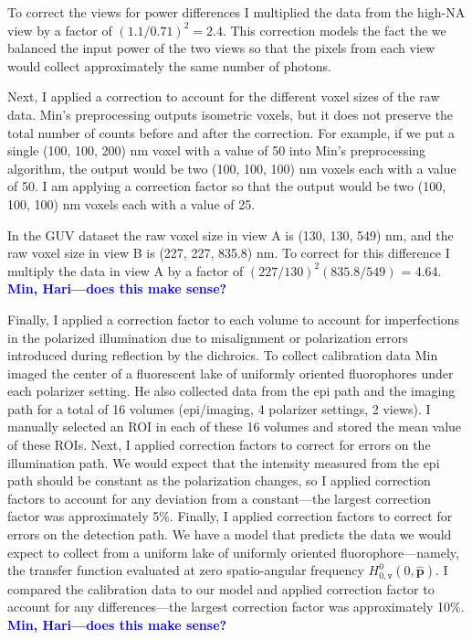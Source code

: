 \documentclass[11pt]{article}
\providecommand{\mh}[1]{\mathbf{\hat{#1}}}
\providecommand{\tv}{\texttt{v}}
\begin{document}
To correct the views for power differences I multiplied the data from the
high-NA view by a factor of $(1.1/0.71)^2 = 2.4$. This correction models the fact the we
balanced the input power of the two views so that the pixels from each view
would collect approximately the same number of photons.

Next, I applied a correction to account for the different voxel sizes of the raw
data. Min's preprocessing outputs isometric voxels, but it does not preserve the
total number of counts before and after the correction. For example, if we put a
single (100, 100, 200) nm voxel with a value of 50 into Min's preprocessing
algorithm, the output would be two (100, 100, 100) nm voxels each with a value
of 50. I am applying a correction factor so that the output would be two (100,
100, 100) nm voxels each with a value of 25.

In the GUV dataset the raw voxel size in view A is (130, 130, 549)
nm, and the raw voxel size in view B is (227, 227, 835.8) nm. To correct for
this difference I multiply the data in view A by a factor of
$(227/130)^2(835.8/549)$ = 4.64. \textcolor{blue}{\textbf{Min, Hari---does this make sense?}}

Finally, I applied a correction factor to each volume to account for
imperfections in the polarized illumination due to misalignment or polarization
errors introduced during reflection by the dichroics. To collect calibration
data Min imaged the center of a fluorescent lake of uniformly oriented
fluorophores under each polarizer setting. He also collected data from the epi
path and the imaging path for a total of 16 volumes (epi/imaging, 4 polarizer
settings, 2 views). I manually selected an ROI in each of these 16 volumes and
stored the mean value of these ROIs. Next, I applied correction factors to
correct for errors on the illumination path. We would expect that the intensity
measured from the epi path should be constant as the polarization changes, so I
applied correction factors to account for any deviation from a constant---the
largest correction factor was approximately 5\%. Finally, I applied correction
factors to correct for errors on the detection path. We have a model that
predicts the data we would expect to collect from a uniform lake of uniformly
oriented fluorophore---namely, the transfer function evaluated at zero
spatio-angular frequency $H_{0,\tv}^0(0,\mh{p})$. I compared the calibration
data to our model and applied correction factor to account for any
differences---the largest correction factor was approximately 10\%.
\textcolor{blue}{\textbf{Min, Hari---does this make sense?}}
\end{document}
